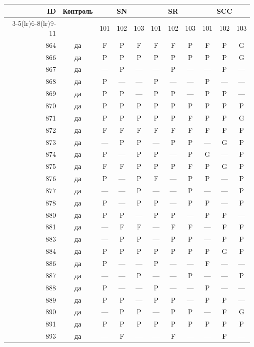 \begin{table}[p]\centering\small
\begin{tabular*}{\textwidth}{@{\extracolsep{\fill}}rc*{9}{c}@{}}\toprule
ID & Контроль & \multicolumn{3}{c}{SN} & \multicolumn{3}{c}{SR} & \multicolumn{3}{c}{SCC}\\
\cmidrule(lr){3-5}\cmidrule(lr){6-8}\cmidrule(lr){9-11}
 & & 101 & 102 & 103 & 101 & 102 & 103 & 101 & 102 & 103\\\midrule
864 & да & F & P & F & F & F & P & F & P & G\\
866 & да & P & P & P & P & P & P & P & P & G\\
867 & да & — & P & — & — & P & — & — & P & —\\
868 & да & P & — & — & P & — & — & P & — & —\\
869 & да & P & P & — & P & P & — & P & P & —\\
870 & да & P & P & P & P & P & P & P & P & P\\
871 & да & P & P & P & P & P & F & P & P & G\\
872 & да & F & F & F & F & F & F & F & F & F\\
873 & да & — & P & P & — & P & P & — & G & P\\
874 & да & P & — & P & P & — & P & G & — & P\\
875 & да & F & F & P & P & P & F & P & G & P\\
876 & да & P & — & P & F & — & P & P & — & P\\
877 & да & — & — & P & — & — & P & — & — & P\\
878 & да & P & — & P & P & — & P & P & — & P\\
880 & да & P & P & — & P & P & — & P & P & —\\
881 & да & — & F & F & — & F & F & — & F & F\\
883 & да & — & P & P & — & P & P & — & P & P\\
884 & да & P & P & P & P & P & P & P & G & P\\
886 & да & P & — & — & P & — & — & F & — & —\\
887 & да & — & — & P & — & — & P & — & — & P\\
888 & да & P & — & — & P & — & — & P & — & —\\
889 & да & P & P & — & P & P & — & P & P & —\\
890 & да & — & P & P & — & P & P & — & F & G\\
891 & да & P & P & P & P & P & P & P & P & P\\
893 & да & — & F & — & — & F & — & — & F & —\\

\end{tabular*}
\end{table}
